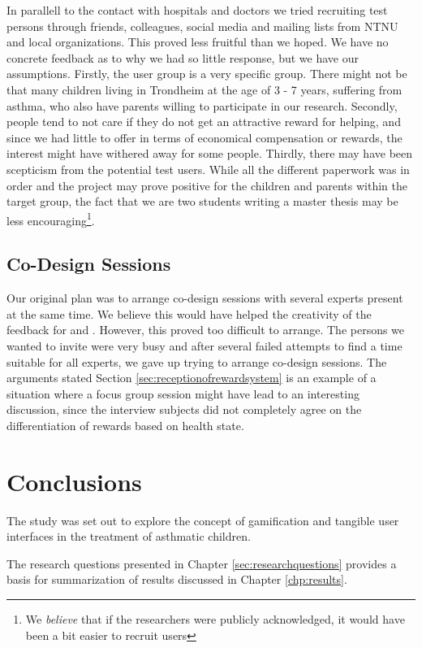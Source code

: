 In parallell to the contact with hospitals and doctors we tried recruiting test persons through friends, colleagues, social media and mailing lists from NTNU and local organizations. This proved less fruitful than we hoped. We have no concrete feedback as to why we had so little response, but we have our assumptions. Firstly, the user group is a very specific group. There might not be that many children living in Trondheim at the age of 3 - 7 years, suffering from asthma, who also have parents willing to participate in our research. Secondly, people tend to not care if they do not get an attractive reward for helping, and since we had little to offer in terms of economical compensation or rewards, the interest might have withered away for some people. Thirdly, there may have been scepticism from the potential test users. While all the different paperwork was in order and the project may prove positive for the children and parents within the target group, the fact that we are two students writing a master thesis may be less encouraging\footnote{We \emph{believe} that if the researchers were publicly acknowledged, it would have been a bit easier to recruit users}.


\subsection{Co-Design Sessions}
\label{sec:codesignsessionsdifficulties}
Our original plan was to arrange co-design sessions with several experts present at the same time. We believe this would have helped the creativity of the feedback for \app{} and \ab{}. However, this proved too difficult to arrange. The persons we wanted to invite were very busy and after several failed attempts to find a time suitable for all experts, we gave up trying to arrange co-design sessions. The arguments stated Section \ref{sec:receptionofrewardsystem} is an example of a situation where a focus group session might have lead to an interesting discussion, since the interview subjects did not completely agree on the differentiation of rewards based on health state.

  
\section{Conclusions}
\label{conlusions}

The study was set out to explore the concept of gamification and tangible user interfaces in the treatment of asthmatic children.

The research questions presented in Chapter \ref{sec:researchquestions} provides a basis for summarization of results discussed in Chapter \ref{chp:results}. 

